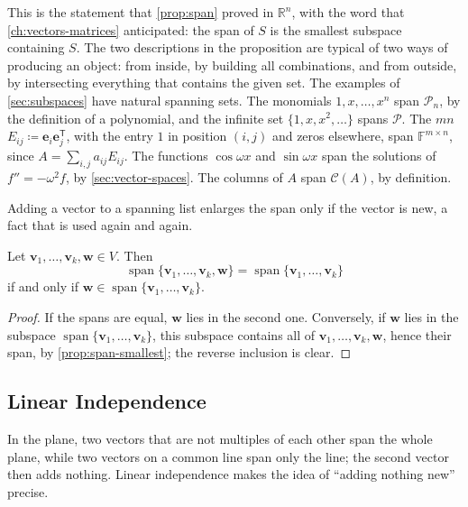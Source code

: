 This is the statement that \cref{prop:span} proved in $\mathbb R^n$, with the word that \cref{ch:vectors-matrices} anticipated: the span of $S$ is the smallest subspace containing $S$. The two descriptions in the proposition are typical of two ways of producing an object: from inside, by building all combinations, and from outside, by intersecting everything that contains the given set. The examples of \cref{sec:subspaces} have natural spanning sets. The monomials $1,x,\ldots,x^n$ span $\mathcal P_n$, by the definition of a polynomial, and the infinite set $\{1,x,x^2,\ldots\}$ spans $\mathcal P$. The $mn$  $E_{ij}\coloneqq\mathbf e_i\mathbf e_j^{\mathsf T}$, with the entry $1$ in position $(i,j)$ and zeros elsewhere, span $\mathbb F^{m\times n}$, since $A=\sum_{i,j}a_{ij}E_{ij}$. The functions $\cos\omega x$ and $\sin\omega x$ span the solutions of $f''=-\omega^2f$, by \cref{sec:vector-spaces}. The columns of $A$ span $\mathcal C(A)$, by definition.

Adding a vector to a spanning list enlarges the span only if the vector is new, a fact that is used again and again.

\begin{proposition}
\label{prop:span-enlarge}
Let $\mathbf v_1,\ldots,\mathbf v_k,\mathbf w\in V$. Then
\[
\operatorname{span}\{\mathbf v_1,\ldots,\mathbf v_k,\mathbf w\}=\operatorname{span}\{\mathbf v_1,\ldots,\mathbf v_k\}
\]
if and only if $\mathbf w\in\operatorname{span}\{\mathbf v_1,\ldots,\mathbf v_k\}$.
\end{proposition}

\begin{proof}
If the spans are equal, $\mathbf w$ lies in the second one. Conversely, if $\mathbf w$ lies in the subspace $\operatorname{span}\{\mathbf v_1,\ldots,\mathbf v_k\}$, this subspace contains all of $\mathbf v_1,\ldots,\mathbf v_k,\mathbf w$, hence their span, by \cref{prop:span-smallest}; the reverse inclusion is clear.
\end{proof}

\subsection{Linear Independence}

In the plane, two vectors that are not multiples of each other span the whole plane, while two vectors on a common line span only the line; the second vector then adds nothing. Linear independence makes the idea of ``adding nothing new'' precise.

